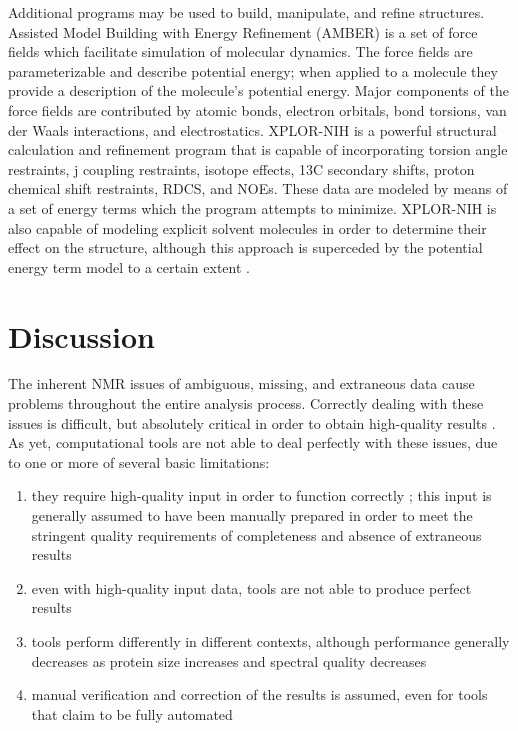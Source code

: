Additional programs may be used to build, manipulate, and refine structures.
Assisted Model Building with Energy Refinement (AMBER) \cite{amber} is a set 
of force fields which facilitate simulation of molecular dynamics.  The
force fields are parameterizable and describe potential energy; when applied
to a molecule they provide a description of the molecule's potential energy. 
Major components of the force fields are contributed by atomic bonds, 
electron orbitals, bond torsions, van der Waals interactions, and electrostatics.
XPLOR-NIH \cite{xplor-nih} is a
powerful structural calculation and refinement program that is capable of
incorporating torsion angle restraints, j coupling restraints, isotope 
effects, 13C secondary shifts, proton chemical shift restraints, RDCS, and NOEs.
These data are modeled by means of a set of energy terms which the program
attempts to minimize.  XPLOR-NIH is also capable of modeling explicit 
solvent molecules in order to determine their effect on the structure, 
although this approach is superceded by the potential energy term model
to a certain extent \cite{xplor-nih}.



\section{Discussion}

The inherent NMR issues of ambiguous, missing, and extraneous data cause 
problems throughout the entire analysis process.  Correctly dealing with 
these issues is difficult, but absolutely critical in order to obtain 
high-quality results \cite{williamson2009automated, guntert2009automated, 
altieri2004automation, baran2004automated}.  As yet, computational tools 
are not able to deal perfectly with these issues, due to one or more of 
several basic limitations: 
\begin{enumerate}
  \item they require high-quality input in order to function correctly 
  \cite{saga, abacus_assignment, mars, autoassign2001, ezassign, pine, cyana2004}; 
  this input is generally assumed to have been manually prepared in order 
  to meet the stringent quality requirements of completeness and absence of 
  extraneous results
  \item even with high-quality input data, tools are not able to produce 
  perfect results 
  \item tools perform differently in different contexts, although 
  performance generally decreases as protein size increases and spectral quality 
  decreases
  \item manual verification and correction of the results is assumed, 
  even for tools that claim to be fully automated 
  \cite{williamson2009automated, guntert2009automated, altieri2004automation,
  baran2004automated}
\end{enumerate}

